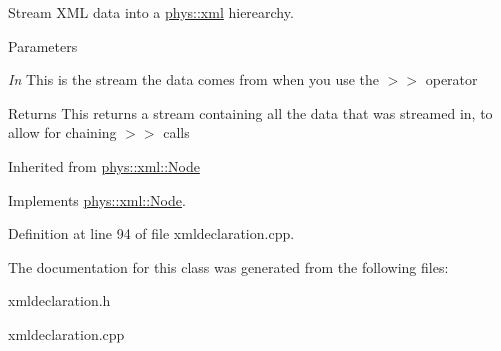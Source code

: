 Stream XML data into a \hyperlink{namespacephys_1_1xml}{phys::xml} hierearchy. 


\begin{DoxyParams}{Parameters}
\item[{\em In}]This is the stream the data comes from when you use the $>$$>$ operator \end{DoxyParams}
\begin{DoxyReturn}{Returns}
This returns a stream containing all the data that was streamed in, to allow for chaining $>$$>$ calls
\end{DoxyReturn}
Inherited from \hyperlink{classphys_1_1xml_1_1Node}{phys::xml::Node} 

Implements \hyperlink{classphys_1_1xml_1_1Node_a400698c30e391c3f098268d4a79d76ca}{phys::xml::Node}.



Definition at line 94 of file xmldeclaration.cpp.



The documentation for this class was generated from the following files:\begin{DoxyCompactItemize}
\item 
xmldeclaration.h\item 
xmldeclaration.cpp\end{DoxyCompactItemize}
